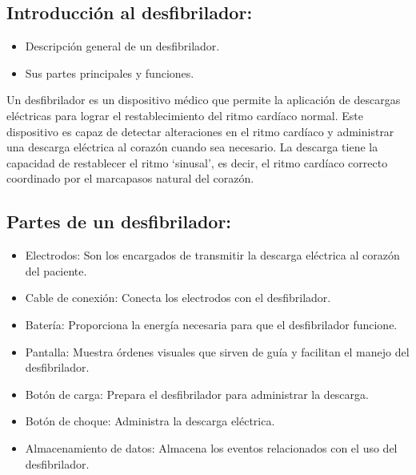 \subsection{Introducción al desfibrilador:}
\begin{itemize}
    \item Descripción general de un desfibrilador.
    \item Sus partes principales y funciones.
\end{itemize}

Un desfibrilador es un dispositivo médico que permite la aplicación de descargas eléctricas para lograr el restablecimiento del ritmo cardíaco normal. Este dispositivo es capaz de detectar alteraciones en el ritmo cardíaco y administrar una descarga eléctrica al corazón cuando sea necesario. La descarga tiene la capacidad de restablecer el ritmo ‘sinusal’, es decir, el ritmo cardíaco correcto coordinado por el marcapasos natural del corazón.

\subsection{Partes de un desfibrilador:}
\begin{itemize}
    \item Electrodos: Son los encargados de transmitir la descarga eléctrica al corazón del paciente.
    \item Cable de conexión: Conecta los electrodos con el desfibrilador.
    \item Batería: Proporciona la energía necesaria para que el desfibrilador funcione.
    \item Pantalla: Muestra órdenes visuales que sirven de guía y facilitan el manejo del desfibrilador.
    \item Botón de carga: Prepara el desfibrilador para administrar la descarga.
    \item Botón de choque: Administra la descarga eléctrica.
    \item Almacenamiento de datos: Almacena los eventos relacionados con el uso del desfibrilador.
\end{itemize}

